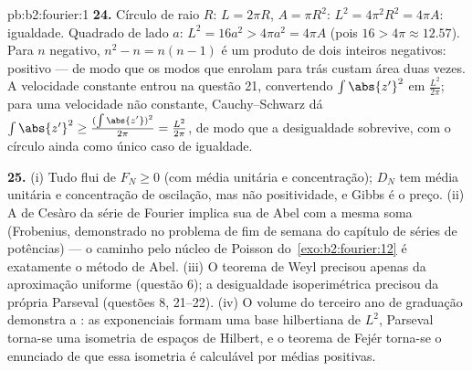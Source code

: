 \begin{solution}{pb:b2:fourier:1}
\textbf{24.} Círculo de raio $R$: $L = 2\pi R$, $A = \pi
R^2$: $L^2 = 4\pi^2R^2 = 4\pi A$: igualdade. Quadrado de lado
$a$: $L^2 = 16a^2 > 4\pi a^2 = 4\pi A$ (pois $16 > 4\pi \approx
12.57$). Para $n$ negativo, $n^2 - n = n(n - 1)$ é um produto
de dois inteiros negativos: positivo --- de modo que os modos que
enrolam para trás custam área duas vezes. A velocidade constante entrou na questão 21,
convertendo $\int\abs{z'}^2$ em $\frac{L^2}{2\pi}$; para uma
velocidade não constante, Cauchy--Schwarz dá $\int\abs{z'}^2 \geq
\frac{(\int\abs{z'})^2}{2\pi} = \frac{L^2}{2\pi}$, de modo que a
desigualdade sobrevive, com o círculo ainda como único caso de
igualdade.

\textbf{25.} (i) Tudo flui de $F_N \geq 0$ (com média
unitária e concentração); $D_N$ tem média unitária e concentração
de oscilação, mas não positividade, e Gibbs é o preço.
(ii) A  de Cesàro da série de Fourier implica sua
 de Abel com a mesma soma (Frobenius, demonstrado no
problema de fim de semana do capítulo de séries de potências) --- o caminho
pelo núcleo de Poisson do~\cref{exo:b2:fourier:12} é exatamente o método de Abel.
(iii) O teorema de Weyl precisou apenas da aproximação uniforme
(questão 6); a desigualdade isoperimétrica precisou da própria
Parseval (questões 8, 21--22). (iv) O volume do terceiro ano de graduação demonstra
a : as exponenciais formam uma base hilbertiana de $L^2$,
Parseval torna-se uma isometria de espaços de Hilbert, e o teorema
de Fejér torna-se o enunciado de que essa isometria é calculável
por médias positivas.
\end{solution}
